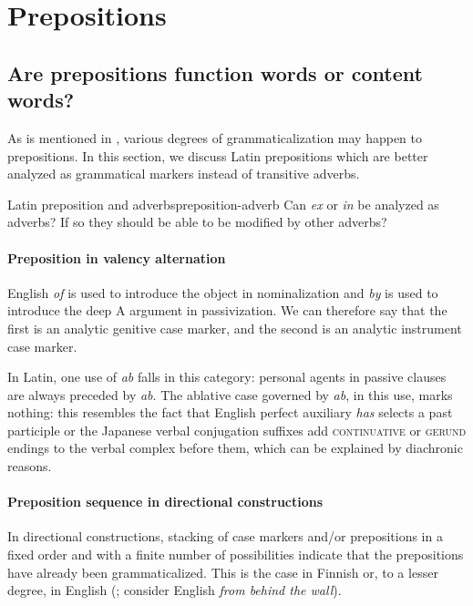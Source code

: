 \documentclass[a4paper, oneside, 12pt]{report}
\newcommand{\form}[1]{\emph{#1}}
\newcommand*{\category}[1]{\textsc{#1}}
\begin{document}
\section{Prepositions}

\subsection{Are prepositions function words or content words?}\label{sec:modify.prep.grammar}

As is mentioned in ,
various degrees of grammaticalization may happen to prepositions.
In this section,
we discuss Latin prepositions which are better analyzed as
grammatical markers instead of transitive adverbs.

\begin{todobox}{Latin preposition and adverbs}{preposition-adverb}
    Can \form{ex} or \form{in} be analyzed as adverbs?
    If so they should be able to be modified by other adverbs?
\end{todobox}

\paragraph*{Preposition in valency alternation}
English \form{of} is used to introduce the object in nominalization 
and \form{by} is used to introduce the deep A argument in passivization.
We can therefore say that the first is an analytic genitive case marker,
and the second is an analytic instrument case marker.

In Latin, one use of \form{ab} falls in this category:
personal agents in passive clauses are always 
preceded by \form{ab}.
The ablative case governed by \form{ab}, in this use, marks nothing:
this resembles the fact that English perfect auxiliary \form{has} selects a past participle 
or the Japanese verbal conjugation suffixes add \category{continuative} or \category{gerund} endings to the verbal complex before them,
which can be explained by diachronic reasons.

\paragraph*{Preposition sequence in directional constructions}
\label{sec:modifiy.prep.grammar.directional}
In directional constructions,
stacking of case markers and/or prepositions in a fixed order 
and with a finite number of possibilities
indicate that the prepositions have already been grammaticalized.
This is the case in Finnish or, to a lesser degree, in English 
(\citealt{spatialpp}; consider English \form{from behind the wall}).
\end{document}
